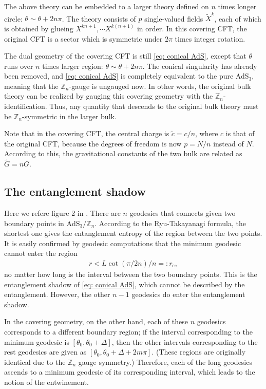 \documentclass[12pt]{article}
\newcommand{\conical}[0]{\mathrm{AdS}_3/\mathbb Z_n}
\begin{document}
The above theory can be embedded to a larger theory defined on $n$ times longer circle: $\theta\sim \theta + 2n\pi$.
The theory consists of $p$ single-valued fields $\tilde X^k$, each of which is obtained by glueing $X^{kn+1}, \cdots X^{k(n+1)}$ in order.
In this covering CFT, the original CFT is a sector which is symmetric under $2\pi$ times integer rotation.

The dual geometry of the covering CFT is still \eqref{eq: conical AdS}, except that $\theta$ runs over $n$ times larger region: $\theta\sim \theta + 2n\pi$.
The conical singularity has already been removed, and \eqref{eq: conical AdS} is completely equivalent to the pure AdS$_3$, meaning that the $\mathbb Z_n$-gauge is ungauged now.
In other words, the original bulk theory can be realized by gauging this covering geometry with the $\mathbb Z_n$-identification.
Thus, any quantity that descends to the original bulk theory must be $\mathbb Z_n$-symmetric in the larger bulk.

Note that in the covering CFT, the central charge is $\tilde c = c/n$, where $c$ is that of the original CFT, because the degrees of freedom is now $p = N/n$ instead of $N$.
According to this, the gravitational constants of the two bulk are related as $\tilde G = nG$.


\subsection*{The entanglement shadow}
Here we refere figure 2 in \cite{Balasubramanian:2014sra}.
There are $n$ geodesics that connects given two boundary points in $\conical$.
According to the Ryu-Takayanagi formula, the shortest one gives the entanglement entropy of the region between the two points.
It is easily confirmed by geodesic computations that the minimum geodesic cannot enter the region
\begin{align}
	r<L\cot(\pi/2n)/n =:r_\mathrm{c},
\end{align}
no matter how long is the interval between the two boundary points.
This is the entanglement shadow of \eqref{eq: conical AdS}, which cannot be described by the entanglement.
However, the other $n-1$ geodesics do enter the entanglement shadow.

In the covering geometry, on the other hand, each of these $n$ geodesics corresponds to a different boundary region; if the interval corresponding to the minimum geodesic is $[\theta_0,\theta_0+\Delta]$, then the other intervals corresponding to the rest geodesics are given as $[\theta_0,\theta_0+\Delta + 2m\pi]$.
(These regions are originally identical due to the $\mathbb Z_n$ gauge symmetry.)
Therefore, each of the long geodesics ascends to a minimum geodesic of its corresponding interval, which leads to the notion of the entwinement.
\end{document}

